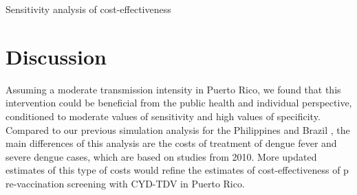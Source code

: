 \documentclass[12pt]{article}\usepackage[]{graphicx}\usepackage[]{color}
\begin{document}
\begin{table}[ht]
  \centering
  
  \caption{Sensitivity analysis of cost-effectiveness} 
  \label{table-tornado}
\end{table}

\section{Discussion}
Assuming a moderate transmission intensity in Puerto Rico, we found that this intervention could be beneficial from the public health and individual perspective, conditioned to moderate values of sensitivity and high values of specificity. Compared to our previous simulation analysis for the Philippines and Brazil \cite{Espana2019Biorxiv}, the main differences of this analysis are the costs of treatment of dengue fever and severe dengue cases, which are based on studies from 2010. More updated estimates of this type of costs would refine the estimates of cost-effectiveness of p re-vaccination screening with CYD-TDV in Puerto Rico. 

 
 
\end{document}
